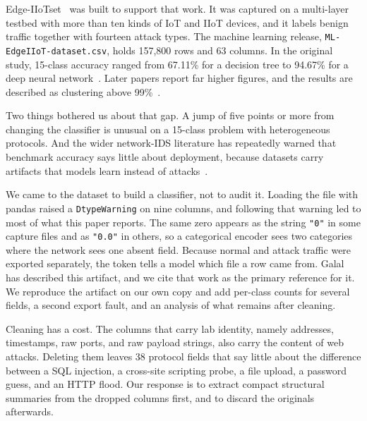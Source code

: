 \documentclass[journal]{IEEEtran}
\newcommand{\zero}{\texttt{"0"}}
\newcommand{\zerof}{\texttt{"0.0"}}
\begin{document}
Edge-IIoTset~\cite{ferrag2022,ferragdata} was built to support that work. It was captured on a multi-layer testbed with more than ten kinds of IoT and IIoT devices, and it labels benign traffic together with fourteen attack types. The machine learning release, \texttt{ML-EdgeIIoT-dataset.csv}, holds 157,800 rows and 63 columns. In the original study, 15-class accuracy ranged from 67.11\% for a decision tree to 94.67\% for a deep neural network~\cite{ferrag2022}. Later papers report far higher figures, and the results are described as clustering above 99\%~\cite{galal2026}.

Two things bothered us about that gap. A jump of five points or more from changing the classifier is unusual on a 15-class problem with heterogeneous protocols. And the wider network-IDS literature has repeatedly warned that benchmark accuracy says little about deployment, because datasets carry artifacts that models learn instead of attacks~\cite{sommer2010,arp2022,engelen2021,liu2022,flood2024,kostas2025}.

We came to the dataset to build a classifier, not to audit it. Loading the file with pandas raised a \texttt{DtypeWarning} on nine columns, and following that warning led to most of what this paper reports. The same zero appears as the string \zero{} in some capture files and as \zerof{} in others, so a categorical encoder sees two categories where the network sees one absent field. Because normal and attack traffic were exported separately, the token tells a model which file a row came from. Galal~\cite{galal2026} has described this artifact, and we cite that work as the primary reference for it. We reproduce the artifact on our own copy and add per-class counts for several fields, a second export fault, and an analysis of what remains after cleaning.

Cleaning has a cost. The columns that carry lab identity, namely addresses, timestamps, raw ports, and raw payload strings, also carry the content of web attacks. Deleting them leaves 38 protocol fields that say little about the difference between a SQL injection, a cross-site scripting probe, a file upload, a password guess, and an HTTP flood. Our response is to extract compact structural summaries from the dropped columns first, and to discard the originals afterwards.
\end{document}
